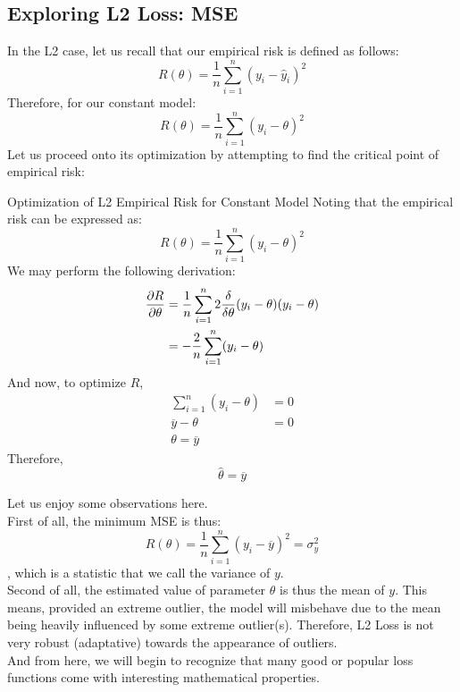 \subsection{Exploring L2 Loss: MSE}
In the L2 case, let us recall that our empirical risk is defined as follows:
\[R(\theta) = \frac{1}{n} \sum_{i = 1}^n {(y_i - \hat{y}_i)}^2\]
Therefore, for our constant model:
\[R(\theta) = \frac{1}{n} \sum_{i = 1}^n {(y_i - \theta)}^2\]
Let us proceed onto its optimization by attempting to find the critical point of empirical risk:
\begin{ln-derive}{Optimization of L2 Empirical Risk for Constant Model}{}
    Noting that the empirical risk can be expressed as:
    \[R(\theta) = \frac{1}{n} \sum_{i = 1}^n {(y_i - \theta)}^2\]
    We may perform the following derivation:
    \begin{align*}
        \pdv{R}{\theta}
        &= \frac{1}{n} \sum_{i = 1}^n 2\frac{\delta}{\delta \theta}(y_i - \theta){(y_i - \theta)} \\
        &= -\frac{2}{n} \sum_{i = 1}^n (y_i - \theta)
    \end{align*}
    And now, to optimize $R$,
    \begin{align*}
        \sum_{i = 1}^n (y_i - \theta) &= 0 \\
        \overline{y} - \theta &= 0 \\
        \theta = \overline{y}
    \end{align*}
    Therefore, 
    \[\hat{\theta} = \overline{y}\]
\end{ln-derive}
Let us enjoy some observations here. \\
First of all, the minimum MSE is thus:
\[R(\theta) = \frac{1}{n} \sum_{i = 1}^n {(y_i - \overline{y})}^2 = \sigma_y^2\]
, which is a statistic that we call the variance of $y$. \\
Second of all, the estimated value of parameter $\theta$ is thus the mean of $y$. This means, provided an extreme outlier, the model will misbehave due to the mean being heavily influenced by some extreme outlier(s). Therefore, L2 Loss is not very robust (adaptative) towards the appearance of outliers. \\
And from here, we will begin to recognize that many good or popular loss functions come with interesting mathematical properties.


